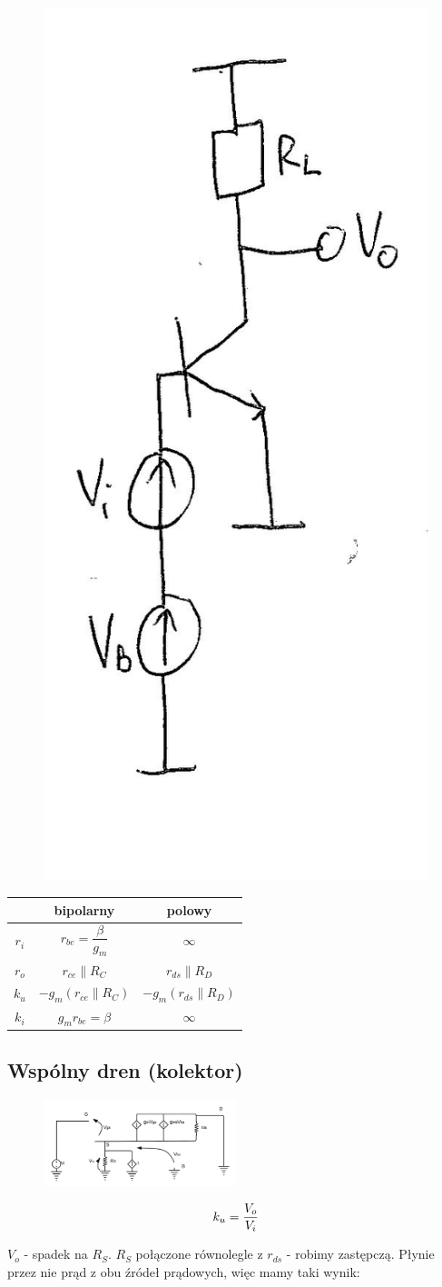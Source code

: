 \documentclass[10pt,a4paper]{article}
\begin{document}
\begin{figure}[H]
\centering
\includegraphics[height=0.5\textwidth]{WE}
\end{figure}
\begin{tabular}{c|c|c}
& bipolarny & polowy\\
\hline
$r_i$ & $r_{be}=\dfrac{\beta}{g_m}$ & $\infty$ \\ 

$r_o$ & $r_{ce}\parallel R_C$ & $r_{ds} \parallel R_D$\\ 

$k_u$ & $-g_m (r_{ce}\parallel R_C)$ & $-g_m(r_{ds}\parallel R_D)$ \\ 

$k_i$ & $g_m r_{be} = \beta$ & $\infty$ \\ 

\end{tabular} 

\subsection{Wspólny dren (kolektor)}


\begin{figure}[H]
\centering
\includegraphics[width=0.5\textwidth]{CD}
\end{figure}

\begin{equation}
k_u = {V_o \over V_i}
\end{equation}

$V_o$ - spadek na $R_S$. $R_S$ połączone równolegle z $r_{ds}$ - robimy zastępczą. Płynie przez nie prąd z obu źródeł prądowych, więc mamy taki wynik:
\end{document}
